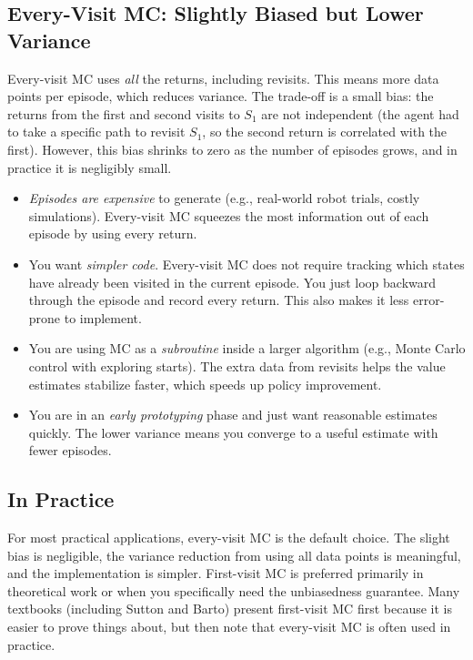 \documentclass[journal, onecolumn]{IEEEtran}
\begin{document}
\subsection{Every-Visit MC: Slightly Biased but Lower Variance}

Every-visit MC uses \textit{all} the returns, including revisits. This means more data points per episode, which reduces variance. The trade-off is a small bias: the returns from the first and second visits to $S_1$ are not independent (the agent had to take a specific path to revisit $S_1$, so the second return is correlated with the first). However, this bias shrinks to zero as the number of episodes grows, and in practice it is negligibly small.

\begin{tcolorbox}[examplebox={Choose Every-Visit MC When...}]
\begin{itemize}[leftmargin=1.5em, itemsep=2pt]
    \item \textit{Episodes are expensive} to generate (e.g., real-world robot trials, costly simulations). Every-visit MC squeezes the most information out of each episode by using every return.
    \item You want \textit{simpler code}. Every-visit MC does not require tracking which states have already been visited in the current episode. You just loop backward through the episode and record every return. This also makes it less error-prone to implement.
    \item You are using MC as a \textit{subroutine} inside a larger algorithm (e.g., Monte Carlo control with exploring starts). The extra data from revisits helps the value estimates stabilize faster, which speeds up policy improvement.
    \item You are in an \textit{early prototyping} phase and just want reasonable estimates quickly. The lower variance means you converge to a useful estimate with fewer episodes.
\end{itemize}
\end{tcolorbox}

\subsection{In Practice}

For most practical applications, every-visit MC is the default choice. The slight bias is negligible, the variance reduction from using all data points is meaningful, and the implementation is simpler. First-visit MC is preferred primarily in theoretical work or when you specifically need the unbiasedness guarantee. Many textbooks (including Sutton and Barto) present first-visit MC first because it is easier to prove things about, but then note that every-visit MC is often used in practice.
\end{document}
